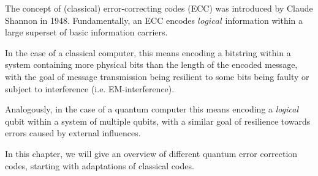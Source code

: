 The concept of (classical) error-correcting codes (ECC) was
introduced by Claude Shannon in 1948\cite{shannon}.
Fundamentally, an ECC encodes $logical$ information within
a large superset of basic information carriers.

In the case of a classical computer, this means encoding a
bitstring within a system containing more physical bits
than the length of the encoded message, with the goal of message transmission
being resilient to some bits being faulty or subject to interference (i.e. EM-interference).

Analogously, in the case of a quantum computer this means encoding a \emph{logical}
qubit within a system of multiple qubits, with a similar goal of resilience towards
errors caused by external influences.

In this chapter, we will give an overview of different quantum error correction codes,
starting with adaptations of classical codes.

\newpage


\newpage